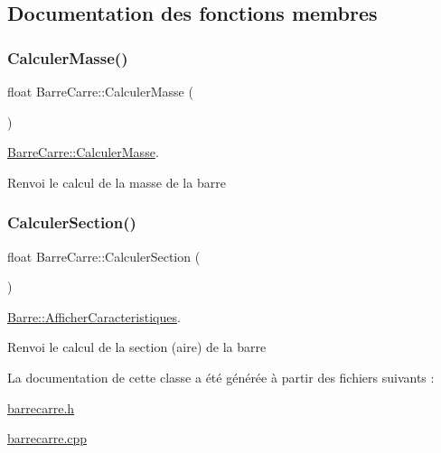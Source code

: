 \subsection{Documentation des fonctions membres}
\mbox{\label{class_barre_carre_ad290f96b7657082e3995c091a41a7a74}} 
\subsubsection{\texorpdfstring{Calculer\+Masse()}{CalculerMasse()}}
{\footnotesize\ttfamily float Barre\+Carre\+::\+Calculer\+Masse (\begin{DoxyParamCaption}{ }\end{DoxyParamCaption})}



\hyperlink{class_barre_carre_ad290f96b7657082e3995c091a41a7a74}{Barre\+Carre\+::\+Calculer\+Masse}. 

Renvoi le calcul de la masse de la barre \mbox{\label{class_barre_carre_a521fa890549009143b4cd1fc0d20ba47}} 
\subsubsection{\texorpdfstring{Calculer\+Section()}{CalculerSection()}}
{\footnotesize\ttfamily float Barre\+Carre\+::\+Calculer\+Section (\begin{DoxyParamCaption}{ }\end{DoxyParamCaption})}



\hyperlink{class_barre_a2e844be9d7c76a74d61cb14243a1bade}{Barre\+::\+Afficher\+Caracteristiques}. 

Renvoi le calcul de la section (aire) de la barre 

La documentation de cette classe a été générée à partir des fichiers suivants \+:\begin{DoxyCompactItemize}
\item 
\hyperlink{barrecarre_8h}{barrecarre.\+h}\item 
\hyperlink{barrecarre_8cpp}{barrecarre.\+cpp}\end{DoxyCompactItemize}
